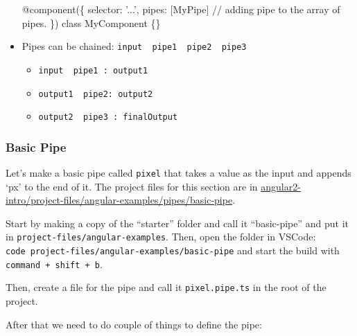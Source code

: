 \documentclass[12pt,]{article}
\newenvironment{Shaded}{}{}
\newcommand{\KeywordTok}[1]{\textcolor[rgb]{0.00,0.00,1.00}{{#1}}}
\newcommand{\CommentTok}[1]{\textcolor[rgb]{0.00,0.50,0.00}{{#1}}}
\newcommand{\FunctionTok}[1]{{#1}}
\newcommand{\NormalTok}[1]{{#1}}
\providecommand{\tightlist}{%
  \setlength{\itemsep}{0pt}\setlength{\parskip}{0pt}}
\begin{document}
\begin{itemize}
\begin{Shaded}
\begin{Highlighting}[numbers=left,,]
\FunctionTok{@component}\NormalTok{(\{}
  \NormalTok{selector: '...',}
  \NormalTok{pipes: [MyPipe] }\CommentTok{// adding pipe to the array of pipes.}
\NormalTok{\})}
\KeywordTok{class} \NormalTok{MyComponent \{\}}
\end{Highlighting}
\end{Shaded}
\item
  Pipes can be chained:
  \texttt{input\ \textbar{}\ pipe1\ \textbar{}\ pipe2\ \textbar{}\ pipe3}

  \begin{itemize}
  \tightlist
  \item
    \texttt{input\ \textbar{}\ pipe1\ :\ output1}
  \item
    \texttt{output1\ \textbar{}\ pipe2:\ output2}
  \item
    \texttt{output2\ \textbar{}\ pipe3\ :\ finalOutput}
  \end{itemize}
\end{itemize}

\subsubsection{Basic Pipe}\label{basic-pipe}

Let's make a basic pipe called \texttt{pixel} that takes a value as the
input and appends `px' to the end of it. The project files for this
section are in
\href{https://github.com/st32lth/angular2-intro/tree/master/project-files/angular-examples/pipes/basic-pipe}{angular2-intro/project-files/angular-examples/pipes/basic-pipe}.

Start by making a copy of the ``starter'' folder and call it
``basic-pipe'' and put it in \texttt{project-files/angular-examples}.
Then, open the folder in VSCode:
\texttt{code\ project-files/angular-examples/basic-pipe} and start the
build with \texttt{command\ +\ shift\ +\ b}.

Then, create a file for the pipe and call it \texttt{pixel.pipe.ts} in
the root of the project.

After that we need to do couple of things to define the pipe:
\end{document}
